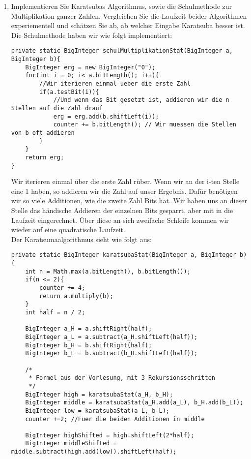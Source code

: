 \documentclass[11pt,a4paper,ngerman]{article}
\begin{document}
\begin{enumerate}[\bfseries (a)]

\item Implementieren Sie Karatsubas Algorithmus, sowie die Schulmethode zur Multiplikation ganzer Zahlen. Vergleichen Sie die Laufzeit beider Algorithmen experiementell und schätzen Sie ab, ab welcher Eingabe Karatsuba besser ist.\\

Die Schulmethode haben wir wie folgt implementiert:

\begin{lstlisting}
private static BigInteger schulMultiplikationStat(BigInteger a, BigInteger b){
	BigInteger erg = new BigInteger("0");
	for(int i = 0; i< a.bitLength(); i++){
		//Wir iterieren einmal ueber die erste Zahl
		if(a.testBit(i)){
			//Und wenn das Bit gesetzt ist, addieren wir die n Stellen auf die Zahl drauf
			erg = erg.add(b.shiftLeft(i));
			counter += b.bitLength(); // Wir muessen die Stellen von b oft addieren
		}
	}
	return erg;
}
\end{lstlisting}

Wir iterieren einmal über die erste Zahl rüber. Wenn wir an der i-ten Stelle eine 1 haben, so addieren wir die Zahl auf unser Ergebnis. Dafür benötigen wir so viele Additionen, wie die zweite Zahl Bits hat. Wir haben uns an dieser Stelle das händische Addieren der einzelnen Bits gesparrt, aber mit in die Laufzeit eingerechnet. Über diese an sich zweifache Schleife kommen wir wieder auf eine quadratische Laufzeit.\\

Der Karatsumaalgorithmus sieht wie folgt aus:

\begin{lstlisting}
private static BigInteger karatsubaStat(BigInteger a, BigInteger b){
	int n = Math.max(a.bitLength(), b.bitLength());
	if(n <= 2){
		counter += 4;
		return a.multiply(b);
	}
	int half = n / 2;

	BigInteger a_H = a.shiftRight(half);	
	BigInteger a_L = a.subtract(a_H.shiftLeft(half)); 
	BigInteger b_H = b.shiftRight(half);
	BigInteger b_L = b.subtract(b_H.shiftLeft(half));
	
	/*
	 * Formel aus der Vorlesung, mit 3 Rekursionsschritten
	 */
	BigInteger high = karatsubaStat(a_H, b_H);
	BigInteger middle = karatsubaStat(a_H.add(a_L), b_H.add(b_L));
	BigInteger low = karatsubaStat(a_L, b_L);
	counter +=2; //Fuer die beiden Additionen in middle
	
	BigInteger highShifted = high.shiftLeft(2*half);
	BigInteger middleShifted = middle.subtract(high.add(low)).shiftLeft(half);
	

\end{lstlisting}
\end{enumerate}
\end{document}
